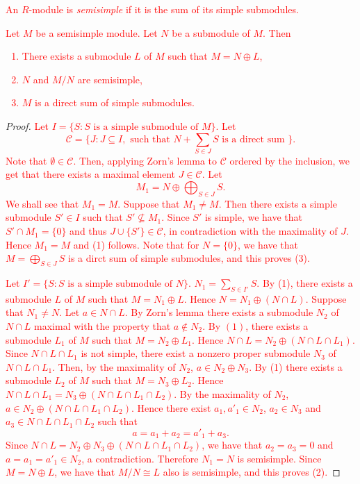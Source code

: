 \textcolor{red}{
\begin{definition}
An $R$-module is {\em semisimple} if it is the sum of its simple submodules.
\end{definition}}
\textcolor{red}{
\begin{proposition}\label{prop:semisimple}
    Let $M$ be a semisimple module. Let $N$ be a submodule of $M$. Then 
    \begin{enumerate}
    \item There exists a submodule $L$ of $M$ such that $M=N\oplus L$,
    \item $N$ and $M/N$ are semisimple,
    \item $M$ is a direct sum of simple submodules.
    \end{enumerate}
\end{proposition}}
\begin{proof} \textcolor{red}{
Let $I=\{ S : S \text{ is a simple submodule of }M\}$. Let
\[\mathcal{C}=\{ J : J\subseteq I, \text{ such that } N+\sum_{S\in J}S \text{ is a direct sum } \} .\]
Note that $\emptyset\in\mathcal{C}$. Then, applying Zorn's lemma to $\mathcal{C}$ ordered by the inclusion, we get that there exists a maximal element $J\in\mathcal{C}$. Let
\[ M_1=N\oplus\bigoplus_{S\in J}S.\]
We shall see that $M_1=M$. Suppose that $M_1\neq M$. Then there exists a simple submodule $S'\in I$ such that $S'\not\subseteq M_1$. Since $S'$ is simple, we have that $S'\cap M_1=\{0\}$ and thus $J\cup\{ S'\}\in \mathcal{C}$, in contradiction with the maximality of $J$. Hence $M_1=M$ and (1) follows. Note that for $N=\{0\}$, we have that $M=\bigoplus_{S\in J}S$ is a dirct sum of simple submodules, and this proves (3).}

\textcolor{red}{
Let $I'=\{ S : S \text{ is a simple submodule of }N\}$. $N_1=\sum_{S\in I'}S$.  By (1), there exists a submodule $L$ of $M$ such that $M=N_1\oplus L$. Hence $N=N_1\oplus (N\cap L)$. Suppose that  $N_1\neq N$. Let $a\in N\cap L$. By Zorn's lemma there exists a submodule $N_2$ of $N\cap L$ maximal with the property that $a\notin N_2$. By $(1)$, there exists a submodule $L_1$ of $M$ such that $M=N_2\oplus L_1$. Hence $N\cap L=N_2\oplus (N\cap L\cap L_1)$. Since $N\cap L\cap L_1$ is not simple, there exist a nonzero proper submodule $N_3$ of $N\cap L\cap L_1$. Then, by the maximality of $N_2$, $a\in N_2\oplus N_3$. By (1) there exists a submodule $L_2$ of $M$ such that $M=N_3\oplus L_2$. Hence $N\cap L\cap L_1=N_3\oplus (N\cap L\cap L_1\cap L_2)$. By the maximality of $N_2$, $a\in N_2\oplus (N\cap L\cap L_1\cap L_2)$. Hence there exist $a_1,a'_1\in N_2$, $a_2\in N_3$ and $a_3\in N\cap L\cap L_1\cap L_2$ such that 
\[a=a_1+a_2=a'_1+a_3.\]
Since $N\cap L=N_2\oplus N_3\oplus (N\cap L\cap L_1\cap L_2)$, we have that $a_2=a_3=0$ and $a=a_1=a'_1\in N_2$, a contradiction. Therefore $N_1=N$ is semisimple. Since $M=N\oplus L$, we have that $M/N\cong L$ also is semisimple, and this proves (2).}
\end{proof}


